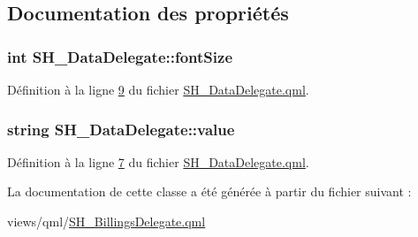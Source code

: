 \subsection{Documentation des propriétés}
\hypertarget{classSH__DataDelegate_afbb41ad9b513c7f27e7b5ad90d82e95b}{
\subsubsection[{font\-Size}]{\setlength{\rightskip}{0pt plus 5cm}int S\-H\-\_\-\-Data\-Delegate\-::font\-Size\hspace{0.3cm}{\ttfamily [inherited]}}}\label{classSH__DataDelegate_afbb41ad9b513c7f27e7b5ad90d82e95b}


Définition à la ligne \hyperlink{SH__DataDelegate_8qml_source_l00009}{9} du fichier \hyperlink{SH__DataDelegate_8qml_source}{S\-H\-\_\-\-Data\-Delegate.\-qml}.

\hypertarget{classSH__DataDelegate_acb9da3c73493c88865e08d9575f26482}{
\subsubsection[{value}]{\setlength{\rightskip}{0pt plus 5cm}string S\-H\-\_\-\-Data\-Delegate\-::value\hspace{0.3cm}{\ttfamily [inherited]}}}\label{classSH__DataDelegate_acb9da3c73493c88865e08d9575f26482}


Définition à la ligne \hyperlink{SH__DataDelegate_8qml_source_l00007}{7} du fichier \hyperlink{SH__DataDelegate_8qml_source}{S\-H\-\_\-\-Data\-Delegate.\-qml}.



La documentation de cette classe a été générée à partir du fichier suivant \-:\begin{DoxyCompactItemize}
\item 
views/qml/\hyperlink{SH__BillingsDelegate_8qml}{S\-H\-\_\-\-Billings\-Delegate.\-qml}\end{DoxyCompactItemize}

